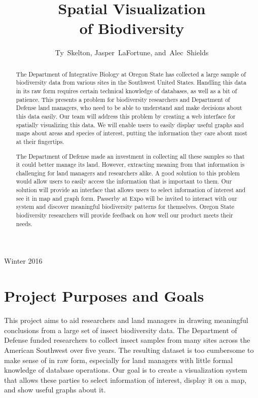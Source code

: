 \documentclass[10pt,draftclsnofoot,onecolumn]{IEEEtran}
\begin{document}
\singlespacing
\title{Spatial Visualization\\ of Biodiversity}

\author{Ty~Skelton,
        Jasper~LaFortune,
        and~Alec~Shields}%

%
{Winter 2016}

\maketitle

\begin{abstract} %
The Department of Integrative Biology at Oregon State has collected a large sample of biodiversity data from various sites in the Southwest United States.
Handling this data in its raw form requires certain technical knowledge of databases, as well as a bit of patience.
This presents a problem for biodiversity researchers and Department of Defense land managers, who need to be able to understand and make decisions about this data easily.
Our team will address this problem by creating a web interface for spatially visualizing this data.
We will enable users to easily display useful graphs and maps about areas and species of interest, putting the information they care about most at their fingertips.

The Department of Defense made an investment in collecting all these samples so that it could better manage its land.
However, extracting meaning from that information is challenging for land managers and researchers alike.
A good solution to this problem would allow users to easily access the information that is important to them.
Our solution will provide an interface that allows users to select information of interest and see it in map and graph form.
Passerby at Expo will be invited to interact with our system and discover meaningful biodiversity patterns for themselves.
Oregon State biodiversity researchers will provide feedback on how well our product meets their needs.

\end{abstract}
\IEEEpeerreviewmaketitle

\newpage
{}

\section{Project Purposes and Goals} %
This project aims to aid researchers and land managers in drawing meaningful conclusions from a large set of insect biodiversity data.
The Department of Defense funded researchers to collect insect samples from many sites across the American Southwest over five years.
The resulting dataset is too cumbersome to make sense of in raw form, especially for land managers with little formal knowledge of database operations.
Our goal is to create a visualization system that allows these parties to select information of interest, display it on a map, and show useful graphs about it.
\end{document}
